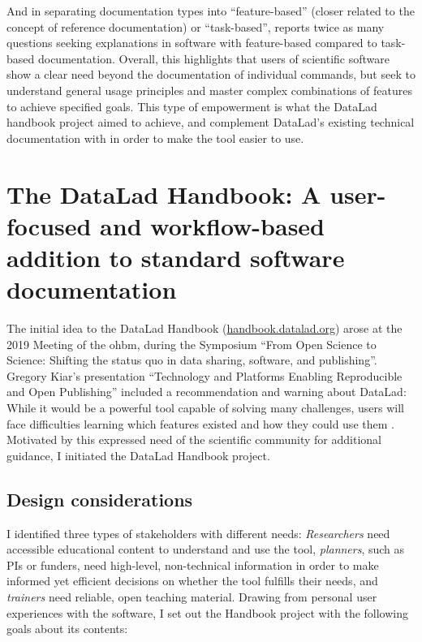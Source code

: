 And in separating documentation types into ``feature-based'' (closer related to the concept of reference documentation) or ``task-based'',  \citet{swarts2019open} reports twice as many questions seeking explanations in software with feature-based compared to task-based documentation.
Overall, this highlights that users of scientific software show a clear need beyond the documentation of individual commands, but seek to understand general usage principles and master complex combinations of features to achieve specified goals.
This type of empowerment is what the DataLad handbook project aimed to achieve, and complement DataLad's existing technical documentation with in order to make the tool easier to use.



\section{The DataLad Handbook: A user-focused and workflow-based addition to standard software documentation}

The initial idea to the DataLad Handbook (\href{http://handbook.datalad.org}{handbook.datalad.org}) arose at the 2019 Meeting of the \gls{ohbm}, during the Symposium ``From Open Science to Science: Shifting the status quo in data sharing, software, and publishing''.
Gregory Kiar's presentation ``Technology and Platforms Enabling Reproducible and Open Publishing'' included a recommendation and warning about DataLad: While it would be a powerful tool capable of solving many challenges, users will face difficulties learning which features existed and how they could use them \citep{kiar}.
Motivated by this expressed need of the scientific community for additional guidance, I initiated the DataLad Handbook project.

\subsection{Design considerations}
I identified three types of stakeholders with different needs: \textit{Researchers} need accessible educational content to understand and use the tool, \textit{planners}, such as PIs or funders, need high-level, non-technical information in order to make informed yet efficient decisions on whether the tool fulfills their needs, and \textit{trainers} need reliable, open teaching material.
Drawing from personal user experiences with the software, I set out the Handbook project with the following goals about its contents:

